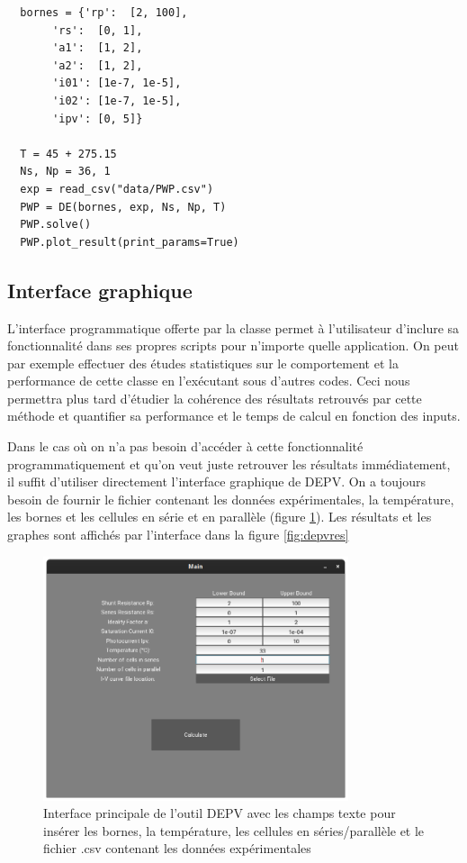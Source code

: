 \begin{verbatim}
  bornes = {'rp':  [2, 100],
       'rs':  [0, 1],
       'a1':  [1, 2],
       'a2':  [1, 2],
       'i01': [1e-7, 1e-5],
       'i02': [1e-7, 1e-5],
       'ipv': [0, 5]}
       
  T = 45 + 275.15
  Ns, Np = 36, 1
  exp = read_csv("data/PWP.csv")
  PWP = DE(bornes, exp, Ns, Np, T)
  PWP.solve()
  PWP.plot_result(print_params=True)
\end{verbatim}


\subsection{Interface graphique}
L'interface programmatique offerte par la classe  permet à l'utilisateur d'inclure sa fonctionnalité dans ses propres scripts pour n'importe quelle application. On peut par exemple effectuer des études statistiques sur le comportement et la performance de cette classe en l'exécutant sous d'autres codes. Ceci nous permettra plus tard d'étudier la cohérence des résultats retrouvés par cette méthode et quantifier sa performance et le temps de calcul en fonction des inputs.

Dans le cas où on n'a pas besoin d'accéder à cette fonctionnalité programmatiquement et qu'on veut juste retrouver les résultats immédiatement, il suffit d'utiliser directement l'interface graphique de DEPV. On a toujours besoin de fournir le fichier contenant les données expérimentales, la température, les bornes et les cellules en série et en parallèle (figure \ref{fig:depvmain}). Les résultats et les graphes sont affichés par l'interface dans la figure \ref{fig:depvres}

\begin{figure}[H]
  \begin{center}
    \includegraphics[width=0.8\textwidth]{resources/paramwindow.png}
    \caption{Interface principale de l'outil DEPV avec les champs texte pour insérer les bornes, la température, les cellules en séries/parallèle et le fichier .csv contenant les données expérimentales}
    \label{fig:depvmain}
  \end{center}
\end{figure}

